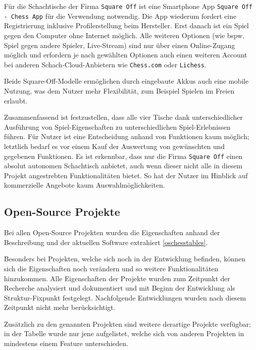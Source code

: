 Für die Schachtische der Firma \passthrough{\lstinline!Square Off!} ist
eine Smartphone App
\passthrough{\lstinline!Square Off - Chess App!}\cite{squareoffapp}
für die Verwendung notwendig. Die App wiederum fordert eine
Registrierung inklusive Profilerstellung beim Hersteller. Erst danach
ist ein Spiel gegen den Computer ohne Internet möglich. Alle weiteren
Optionen (wie bspw. Spiel gegen andere Spieler, Live-Stream) sind nur
über einen Online-Zugang möglich und erfordern je nach gewählten
Optionen auch einen weiteren Account bei anderen Schach-Cloud-Anbietern
wie \passthrough{\lstinline!Chess.com!} oder
\passthrough{\lstinline!Lichess!}.

Beide Square-Off-Modelle ermöglichen durch eingebaute Akkus auch eine
mobile Nutzung, was dem Nutzer mehr Flexibilität, zum Beispiel Spielen
im Freien erlaubt.

Zusammenfassend ist festzustellen, dass alle vier Tische dank
unterschiedlicher Ausführung von Spiel-Eigenschaften zu
unterschiedlichen Spiel-Erlebnissen führen. Für Nutzer ist eine
Entscheidung anhand von Funktionen kaum möglich; letztlich bedarf es vor
einem Kauf der Auswertung von gewünschten und gegebenen Funktionen. Es
ist erkennbar, dass nur die Firma \passthrough{\lstinline!Square Off!}
einen absolut autonomen Schachtisch anbietet, auch wenn dieser nicht
alle in diesem Projekt angestrebten Funktionalitäten bietet. So hat der
Nutzer im Hinblick auf kommerzielle Angebote kaum Auswahlmöglichkeiten.

\hypertarget{open-source-projekte}{%
\subsection{Open-Source Projekte}\label{open-source-projekte}}

Bei allen Open-Source Projekten wurden die Eigenschaften anhand der
Beschreibung und der aktuellen Software extrahiert \ref{oschesstables}.

Besonders bei Projekten, welche sich noch in der Entwicklung befinden,
können sich die Eigenschaften noch verändern und so weitere
Funktionalitäten hinzukommen. Alle Eigenschaften der Projekte wurden zum
Zeitpunkt der Recherche analysiert und dokumentiert und mit Beginn der
Entwicklung als Struktur-Fixpunkt festgelegt. Nachfolgende Entwicklungen
wurden nach diesem Zeitpunkt nicht mehr berücksichtigt.

Zusätzlich zu den genannten Projekten sind weitere derartige Projekte
verfügbar; in der Tabelle wurde nur jene aufgelistet, welche sich von
anderen Projekten in mindestens einem Feature unterschieden.

